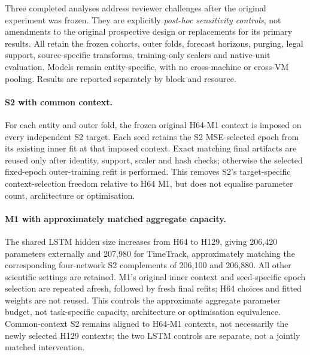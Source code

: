 \documentclass[a4paper,fleqn]{cas-dc}
\begin{document}
Three completed analyses address reviewer challenges after the original
experiment was frozen. They are explicitly \emph{post-hoc sensitivity
controls}, not amendments to the original prospective design or replacements
for its primary results. All retain the frozen cohorts, outer folds,
forecast horizons, purging, legal support, source-specific transforms,
training-only scalers and native-unit evaluation. Models remain
entity-specific, with no cross-machine or cross-VM pooling. Results are
reported separately by block and resource.

\paragraph{S2 with common context.}
For each entity and outer fold, the frozen original H64-M1 context is imposed
on every independent S2 target. Each seed retains the S2 MSE-selected epoch
from its existing inner fit at that imposed context. Exact matching final
artifacts are reused only after identity, support, scaler and hash checks;
otherwise the selected fixed-epoch outer-training refit is performed.
This removes S2's target-specific context-selection freedom relative to
H64 M1, but does not equalise parameter count, architecture or optimisation.

\paragraph{M1 with approximately matched aggregate capacity.}
The shared LSTM hidden size increases from H64 to H129, giving 206,420
parameters externally and 207,980 for TimeTrack, approximately matching the
corresponding four-network S2 complements of 206,100 and 206,880. All other
scientific settings are retained. M1's original inner context and
seed-specific epoch selection are repeated afresh, followed by fresh final
refits; H64 choices and fitted weights are not reused. This controls the
approximate aggregate parameter budget, not task-specific capacity,
architecture or optimisation equivalence. Common-context S2 remains aligned
to H64-M1 contexts, not necessarily the newly selected H129 contexts; the
two LSTM controls are separate, not a jointly matched intervention.
\end{document}
